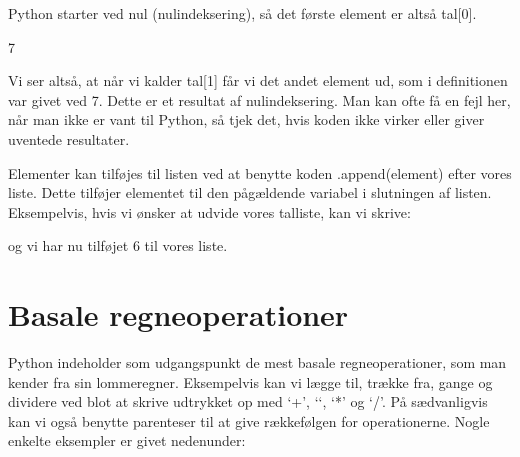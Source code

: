 \documentclass[letterpaper,10pt,english]{jupyterBook}
\begin{document}
 Python starter ved nul (nul\sphinxhyphen{}indeksering), så det første element er altså tal{[}0{]}.

\begin{sphinxVerbatim}[commandchars=\\\{\}]
  \PYG{p}{[}  \PYG{p}{]}
\PYG{p}{[}\PYG{p}{]}
\end{sphinxVerbatim}

\begin{sphinxVerbatim}[commandchars=\\\{\}]
7
\end{sphinxVerbatim}

Vi ser altså, at når vi kalder tal{[}1{]} får vi det andet element ud, som i definitionen var givet ved 7. Dette er et resultat af nul\sphinxhyphen{}indeksering. Man kan ofte få en fejl her, når man ikke er vant til Python, så tjek det, hvis koden ikke virker eller giver uventede resultater.

Elementer kan tilføjes til listen ved at benytte koden .append(element) efter vores liste. Dette tilføjer elementet til den pågældende variabel i slutningen af listen. Eksempelvis, hvis vi ønsker at udvide vores tal\sphinxhyphen{}liste, kan vi skrive:

\begin{sphinxVerbatim}[commandchars=\\\{\}]
\end{sphinxVerbatim}

\begin{sphinxVerbatim}[commandchars=\\\{\}]
[4, 7, 10, 6]
\end{sphinxVerbatim}

og vi har nu tilføjet 6 til vores liste.


\section{Basale regneoperationer}
\label{\detokenize{notebooks/Basal_python:basale-regneoperationer}}
Python indeholder som udgangspunkt de mest basale regneoperationer, som man kender fra sin lommeregner. Eksempelvis kan vi lægge til, trække fra, gange og dividere ved blot at skrive udtrykket op med ‘+’, ‘\sphinxhyphen{}‘, ‘*’ og ‘/’. På sædvanligvis  kan vi også benytte parenteser til at give rækkefølgen for operationerne. Nogle enkelte eksempler er givet nedenunder:
\end{document}
